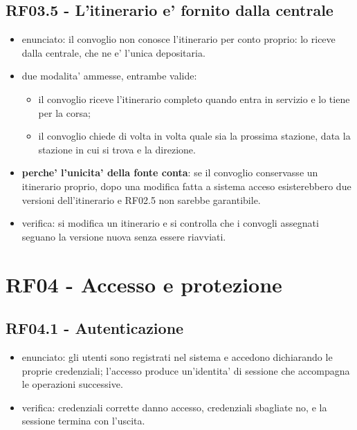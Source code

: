 \documentclass[11pt]{article}
\begin{document}
\subsection{RF03.5 - L'itinerario e' fornito dalla centrale}
\label{sec:org944c390}
\begin{itemize}
\item enunciato: il convoglio non conosce l'itinerario per conto proprio: lo riceve dalla centrale, che
ne e' l'unica depositaria.
\item due modalita' ammesse, entrambe valide:
\begin{itemize}
\item il convoglio riceve l'itinerario completo quando entra in servizio e lo tiene per la corsa;
\item il convoglio chiede di volta in volta quale sia la prossima stazione, data la stazione in cui si
trova e la direzione.
\end{itemize}
\item \textbf{perche' l'unicita' della fonte conta}: se il convoglio conservasse un itinerario proprio, dopo una
modifica fatta a sistema acceso esisterebbero due versioni dell'itinerario e RF02.5 non sarebbe
garantibile.
\item verifica: si modifica un itinerario e si controlla che i convogli assegnati seguano la versione
nuova senza essere riavviati.
\end{itemize}
\section{RF04 - Accesso e protezione}
\label{sec:org1c52097}

\subsection{RF04.1 - Autenticazione}
\label{sec:org2a888e9}
\begin{itemize}
\item enunciato: gli utenti sono registrati nel sistema e accedono dichiarando le proprie credenziali;
l'accesso produce un'identita' di sessione che accompagna le operazioni successive.
\item verifica: credenziali corrette danno accesso, credenziali sbagliate no, e la sessione termina con
l'uscita.
\end{itemize}
\end{document}
